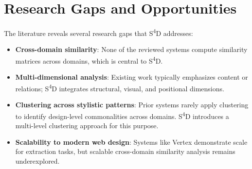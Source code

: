 \section{Research Gaps and Opportunities}
\label{sec:research-gaps}

The literature reveals several research gaps that S\textsuperscript{4}D addresses:

\begin{itemize}
    \item \textbf{Cross-domain similarity}: None of the reviewed systems compute similarity matrices across domains, which is central to S\textsuperscript{4}D.
    \item \textbf{Multi-dimensional analysis}: Existing work typically emphasizes content or relations; S\textsuperscript{4}D integrates structural, visual, and positional dimensions.
    \item \textbf{Clustering across stylistic patterns}: Prior systems rarely apply clustering to identify design-level commonalities across domains. S\textsuperscript{4}D introduces a multi-level clustering approach for this purpose.
    \item \textbf{Scalability to modern web design}: Systems like Vertex demonstrate scale for extraction tasks, but scalable cross-domain similarity analysis remains underexplored.
\end{itemize}






